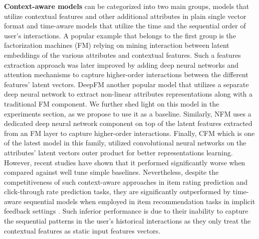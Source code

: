 \documentclass[sigconf,natbib=true]{acmart}
\begin{document}
\textbf{Context-aware models} can be categorized into two main groups, models that utilize contextual features and other additional attributes in plain single vector format \cite{rendle2010factorization,guo2017deepfm,xin2019cfm} and time-aware models that utilize the time and the sequential order of user's interactions. A popular example that belongs to the first group is the factorization machines (FM) \cite{rendle2010factorization} relying on mining interaction between latent embeddings of the various attributes and contextual features. Such a features extraction approach was later improved by adding deep neural networks \cite{he2017neural,guo2017deepfm} and attention mechanisms \cite{xiao2017attentional} to capture higher-order interactions between the different features' latent vectors. DeepFM \cite{guo2017deepfm} another popular model that utilizes a separate deep neural network to extract non-linear attributes representations along with a traditional FM component. We further shed light on this model in the experiments section, as we propose to use it as a baseline. Similarly, NFM \cite{he2017neural} uses a dedicated deep neural network component on top of the latent features extracted from an FM layer to capture higher-order interactions. Finally, CFM \cite{xin2019cfm} which is one of the latest model in this family, utilized convolutional neural networks on the attributes' latent vectors outer product for better representations learning. However, recent studies \cite{ferrari2020critically} have shown that it performed significantly worse when compared against well tune simple baselines. Nevertheless, despite the competitiveness of such context-aware approaches in item rating prediction and click-through rate prediction tasks, they are significantly outperformed by time-aware sequential models when employed in item recommendation tasks in implicit feedback settings \cite{kang2018self,ZhouWZZWZWW20,zhang2019feature}. Such inferior performance is due to their inability to capture the sequential patterns in the user's historical interactions as they only treat the contextual features as static input features vectors.
\end{document}
